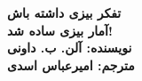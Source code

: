 \documentclass{book}
\begin{document}
\makeatletter
    \begin{titlepage}
        \begin{center}
		{\Huge \bfseries  تفکر بیزی داشته باش }\\\vspace{0.5cm}
		{\huge \bfseries  آمار بیزی ساده شد!}\\\vspace{1cm}
		{\Large \bfseries  نویسنده: آلن. ب. داونی }\\\vspace{0.25cm}
            	{\Large \bfseries  مترجم: امیرعباس اسدی }\vspace{0.25cm}
        \end{center}
    \end{titlepage}
\makeatother
\thispagestyle{empty}
\tableofcontents

\end{document}

